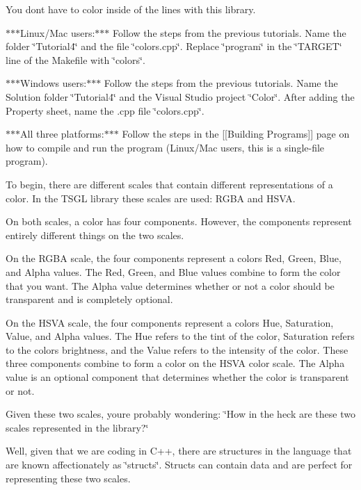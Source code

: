 You don\textquotesingle{}t have to color inside of the lines with this library.

$\ast$$\ast$$\ast$\+Linux/\+Mac users\+:$\ast$$\ast$$\ast$ Follow the steps from the previous tutorials. Name the folder \char`\"{}\+Tutorial4\char`\"{} and the file \char`\"{}colors.\+cpp\char`\"{}. Replace \char`\"{}program\char`\"{} in the \char`\"{}\+T\+A\+R\+G\+E\+T\char`\"{} line of the Makefile with \char`\"{}colors\char`\"{}.

$\ast$$\ast$$\ast$\+Windows users\+:$\ast$$\ast$$\ast$ Follow the steps from the previous tutorials. Name the Solution folder \char`\"{}\+Tutorial4\char`\"{} and the Visual Studio project \char`\"{}\+Color\char`\"{}. After adding the Property sheet, name the .cpp file \char`\"{}colors.\+cpp\char`\"{}.

$\ast$$\ast$$\ast$\+All three platforms\+:$\ast$$\ast$$\ast$ Follow the steps in the \mbox{[}\mbox{[}Building Programs\mbox{]}\mbox{]} page on how to compile and run the program (Linux/\+Mac users, this is a single-\/file program).

To begin, there are different scales that contain different representations of a color. In the T\+S\+G\+L library these scales are used\+: R\+G\+B\+A and H\+S\+V\+A.

On both scales, a color has four components. However, the components represent entirely different things on the two scales.

On the R\+G\+B\+A scale, the four components represent a color\textquotesingle{}s Red, Green, Blue, and Alpha values. The Red, Green, and Blue values combine to form the color that you want. The Alpha value determines whether or not a color should be transparent and is completely optional.

On the H\+S\+V\+A scale, the four components represent a color\textquotesingle{}s Hue, Saturation, Value, and Alpha values. The Hue refers to the tint of the color, Saturation refers to the color\textquotesingle{}s brightness, and the Value refers to the intensity of the color. These three components combine to form a color on the H\+S\+V\+A color scale. The Alpha value is an optional component that determines whether the color is transparent or not.

Given these two scales, you\textquotesingle{}re probably wondering\+: \char`\"{}\+How in the heck are these two scales represented in the library?\char`\"{}

Well, given that we are coding in C++, there are structures in the language that are known affectionately as \char`\"{}structs\char`\"{}. Structs can contain data and are perfect for representing these two scales.

